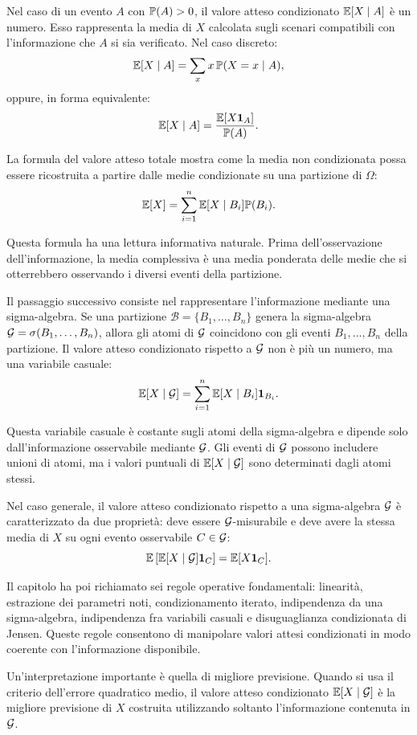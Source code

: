 Nel caso di un evento $A$ con $\mathbb{P}(A)>0$, il valore atteso condizionato
$\mathbb{E}[X\mid A]$ \`{e} un numero. Esso rappresenta la media di $X$
calcolata sugli scenari compatibili con l'informazione che $A$ si sia
verificato. Nel caso discreto:
\[
\mathbb{E}[X\mid A]
=
\sum_x x\,\mathbb{P}(X=x\mid A),
\]
oppure, in forma equivalente:
\[
\mathbb{E}[X\mid A]
=
\frac{\mathbb{E}[X\mathbf{1}_A]}{\mathbb{P}(A)}.
\]

La formula del valore atteso totale mostra come la media non condizionata
possa essere ricostruita a partire dalle medie condizionate su una partizione
di $\Omega$:
\[
\mathbb{E}[X]
=
\sum_{i=1}^{n}
\mathbb{E}[X\mid B_i]\mathbb{P}(B_i).
\]

Questa formula ha una lettura informativa naturale. Prima dell'osservazione
dell'informazione, la media complessiva \`{e} una media ponderata delle medie
che si otterrebbero osservando i diversi eventi della partizione.

Il passaggio successivo consiste nel rappresentare l'informazione mediante una
sigma-algebra. Se una partizione
$\mathcal{B}=\{B_1,\ldots,B_n\}$ genera la sigma-algebra
$\mathcal{G}=\sigma(B_1,\ldots,B_n)$, allora gli atomi di $\mathcal{G}$
coincidono con gli eventi $B_1,\ldots,B_n$ della partizione. Il valore atteso
condizionato rispetto a $\mathcal{G}$ non \`{e} pi\`{u} un numero, ma una
variabile casuale:
\[
\mathbb{E}[X\mid\mathcal{G}]
=
\sum_{i=1}^{n}
\mathbb{E}[X\mid B_i]\mathbf{1}_{B_i}.
\]

Questa variabile casuale \`{e} costante sugli atomi della sigma-algebra e
dipende solo dall'informazione osservabile mediante $\mathcal{G}$. Gli eventi
di $\mathcal{G}$ possono includere unioni di atomi, ma i valori puntuali di
$\mathbb{E}[X\mid\mathcal{G}]$ sono determinati dagli atomi stessi.

Nel caso generale, il valore atteso condizionato rispetto a una sigma-algebra
$\mathcal{G}$ \`{e} caratterizzato da due propriet\`{a}: deve essere
$\mathcal{G}$-misurabile e deve avere la stessa media di $X$ su ogni evento
osservabile $C\in\mathcal{G}$:
\[
\mathbb{E}\left[
\mathbb{E}[X\mid\mathcal{G}]\mathbf{1}_C
\right]
=
\mathbb{E}[X\mathbf{1}_C].
\]

Il capitolo ha poi richiamato sei regole operative fondamentali: linearit\`{a},
estrazione dei parametri noti, condizionamento iterato, indipendenza da una
sigma-algebra, indipendenza fra variabili casuali e disuguaglianza
condizionata di Jensen. Queste regole consentono di manipolare valori attesi
condizionati in modo coerente con l'informazione disponibile.

Un'interpretazione importante \`{e} quella di migliore previsione. Quando si
usa il criterio dell'errore quadratico medio, il valore atteso condizionato
$\mathbb{E}[X\mid\mathcal{G}]$ \`{e} la migliore previsione di $X$ costruita
utilizzando soltanto l'informazione contenuta in $\mathcal{G}$.

